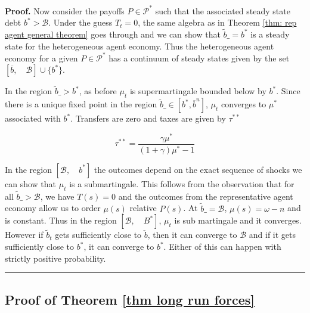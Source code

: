 \documentclass[thmsb,11pt]{article}
\newenvironment{proof}[1][Proof]{\noindent \textbf{#1.} }{\  \rule{0.5em}{0.5em}}
\begin{document}
\begin{proof}
Now consider the payoffs $P\in \mathcal {P}^*$ such that the associated steady state debt $b^*>\mathcal{B}$. Under the guess $T_t=0$, the same algebra as in Theorem \ref{thm: rep agent general theorem} goes through and we can show that $\tilde b\_=b^*$ is a steady state for the heterogeneous agent economy. Thus the heterogeneous agent economy for a given $P\in \mathcal{P}^*$ has a continuum of steady states given by the set $[\overline b, \quad \mathcal{B}] \cup \{b^*\}$.



In the region $\tilde b\_>b^*$, as before $\mu_t$ is supermartingale bounded below by $b^*$. Since there is a unique fixed point in the region $\tilde b\_ \in [b^*, \overline b^{n}]$, $\mu_t$ converges to $\mu^*$ associated with $b^*$. Transfers are zero and taxes are given by $\tau^{**}$


\begin{equation}
\tau^{**} = \frac{\gamma\mu^*}{(1+\gamma)\mu^*-1}
\end{equation}



In the region $[\mathcal{B},\quad b^*]$ the outcomes depend on the exact sequence of shocks we can show that $\mu_t$ is a submartingale. This follows from the observation that for all $\tilde b\_> \mathcal{B}$, we have $T(s)=0$ and the outcomes from the representative agent economy allow us to order $\mu(s)$ relative $P(s)$. At $\tilde{b}\_=\mathcal{B}$, $\mu(s)=\omega-n$ and is constant. Thus in the region $[\mathcal{B},\quad B^*]$, $\mu_t$ is sub martingale and it converges. However if $\tilde b_t$ gets sufficiently close to $\check b$, then it can converge to $\mathcal{B}$ and if it gets sufficiently close to $b^*$, it can converge to $b^*$. Either of this can happen with strictly positive probability.
\end{proof}


\newpage

\subsection{Proof of Theorem \protect\ref{thm long run forces}}
\end{document}
